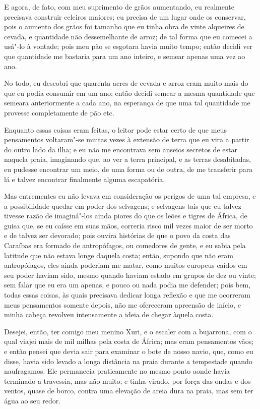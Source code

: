 E agora, de fato, com meu suprimento de grãos aumentando, eu realmente
precisava construir celeiros maiores; eu precisa de um lugar onde os
conservar, pois o aumento dos grãos foi tamanho que eu tinha obra de
vinte alqueires de cevada, e quantidade não dessemelhante de arroz; de
tal forma que eu comecei a usá"-lo à vontade; pois meu pão se esgotara
havia muito tempo; então decidi ver que quantidade me bastaria para um
ano inteiro, e semear apenas uma vez ao ano.

No todo, eu descobri que quarenta acres de cevada e arroz eram muito
mais do que eu podia consumir em um ano; então decidi semear a mesma
quantidade que semeara anteriormente a cada ano, na esperança de que uma
tal quantidade me provesse completamente de pão etc.

Enquanto essas coisas eram feitas, o leitor pode estar certo de que meus
pensamentos voltaram"-se muitas vezes à extensão de terra que eu vira a
partir do outro lado da ilha; e eu não me encontrava sem anseios
secretos de estar naquela praia, imaginando que, ao ver a terra
principal, e as terras desabitadas, eu pudesse encontrar um meio, de uma
forma ou de outra, de me transferir para lá e talvez encontrar
finalmente alguma escapatória.

Mas entrementes eu não levava em consideração os perigos de uma tal
empresa, e a possibilidade quedar em poder dos selvagens; e selvagens
tais que eu talvez tivesse razão de imaginá"-los ainda piores do que os
leões e tigres de África, de guisa que, se eu caísse em suas mãos,
correria risco mil vezes maior de ser morto e de talvez ser devorado;
pois ouvira histórias de que o povo da costa das Caraíbas era formado de
antropófagos, ou comedores de gente, e eu sabia pela latitude que não
estava longe daquela costa; então, supondo que não eram antropófagos,
eles ainda poderiam me matar, como muitos europeus caídos em seu poder
haviam sido, mesmo quando haviam estado em grupos de dez ou vinte; sem
falar que eu era um apenas, e pouco ou nada podia me defender; pois bem,
todas essas coisas, às quais precisava dedicar longa reflexão e que me
ocorreram meus pensamentos somente depois, não me ofereceram apreensão
de início, e minha cabeça revolveu intensamente a ideia de chegar àquela
costa.

Desejei, então, ter comigo meu menino Xuri, e o escaler com a bujarrona,
com o qual viajei mais de mil milhas pela costa de África; mas eram
pensamentos vãos; e então pensei que devia sair para examinar o bote de
nosso navio, que, como eu disse, havia sido levado a longa distância na
praia durante a tempestade quando naufragamos. Ele permanecia
praticamente no mesmo ponto aonde havia terminado a travessia, mas não
muito; e tinha virado, por força das ondas e dos ventos, quase de borco,
contra uma elevação de areia dura na praia, mas sem ter água ao seu
redor.

